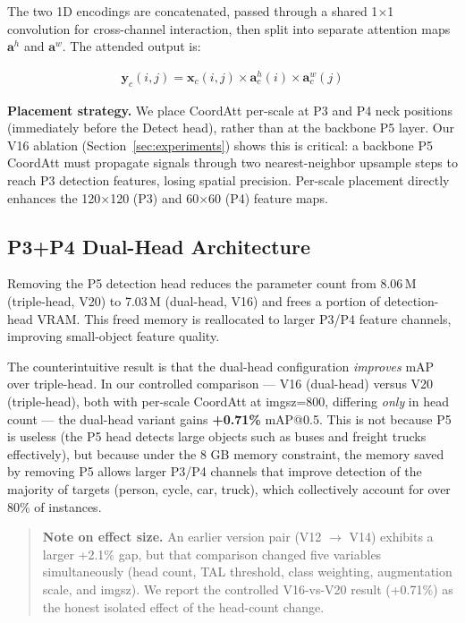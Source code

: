 \documentclass[11pt]{article}
\begin{document}
The two 1D encodings are concatenated, passed through a shared 1$\times$1 convolution for
cross-channel interaction, then split into separate attention maps $\mathbf{a}^h$ and
$\mathbf{a}^w$. The attended output is:

\begin{align}
    \mathbf{y}_c(i, j) = \mathbf{x}_c(i, j) \times \mathbf{a}^h_c(i) \times \mathbf{a}^w_c(j)
\end{align}

\textbf{Placement strategy.} We place CoordAtt per-scale at P3 and P4 neck positions (immediately
before the Detect head), rather than at the backbone P5 layer. Our V16 ablation (Section~\ref{sec:experiments})
shows this is critical: a backbone P5 CoordAtt must propagate signals through two nearest-neighbor
upsample steps to reach P3 detection features, losing spatial precision. Per-scale placement
directly enhances the 120$\times$120 (P3) and 60$\times$60 (P4) feature maps.

\subsection{P3+P4 Dual-Head Architecture}

Removing the P5 detection head reduces the parameter count from 8.06\,M (triple-head, V20)
to 7.03\,M (dual-head, V16) and frees a portion of detection-head VRAM. This freed memory is
reallocated to larger P3/P4 feature channels, improving small-object feature quality.

The counterintuitive result is that the dual-head configuration \textit{improves} mAP over
triple-head. In our controlled comparison — V16 (dual-head) versus V20 (triple-head), both with
per-scale CoordAtt at imgsz=800, differing \textit{only} in head count — the dual-head variant
gains \textbf{+0.71\%} mAP@0.5. This is not because P5 is useless (the P5 head detects large
objects such as buses and freight trucks effectively), but because under the 8 GB memory
constraint, the memory saved by removing P5 allows larger P3/P4 channels that improve detection
of the majority of targets (person, cycle, car, truck), which collectively account for over
80\% of instances.

\begin{quote}
\textbf{Note on effect size.} An earlier version pair (V12 $\rightarrow$ V14) exhibits a larger
+2.1\% gap, but that comparison changed five variables simultaneously (head count, TAL threshold,
class weighting, augmentation scale, and imgsz). We report the controlled V16-vs-V20 result
(+0.71\%) as the honest isolated effect of the head-count change.
\end{quote}
\end{document}
